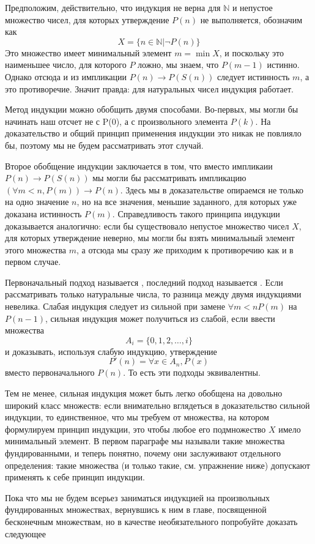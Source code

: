 Предположим, действительно, что индукция не верна для $\mathbb{N}$ и непустое множество чисел, для которых утверждение $P(n)$ не выполняется, обозначим как
$$X = \{n\in\mathbb{N}|\neg P(n)\}$$
Это множество имеет минимальный элемент $m=\min X$, и поскольку это наименьшее число, для которого $P$ ложно, мы знаем, что $P(m-1)$ истинно. Однако отсюда и из импликации $P(n)\to P(S(n))$ следует истинность $m$, а это противоречие. Значит правда: для натуральных чисел индукция работает.

Метод индукции можно обобщить двумя способами. Во-первых, мы могли бы начинать наш отсчет не с P(0), а с произвольного элемента $P(k)$. На доказательство и общий принцип применения индукции это никак не повлияло бы, поэтому мы не будем рассматривать этот случай.

Второе обобщение индукции заключается в том, что вместо импликаии $P(n)\to P(S(n))$ мы могли бы рассматривать импликацию $(\forall m<n, P(m))\to P(n)$. Здесь мы в доказательстве опираемся не только на одно значение $n$, но на все значения, меньшие заданного, для которых уже доказана истинность $P(m)$. Справедливость такого принципа индукции доказывается аналогично: если бы существовало непустое множество чисел $X$, для которых утверждение неверно, мы могли бы взять минимальный элемент этого множества $m$, а отсюда мы сразу же приходим к противоречию как и в первом случае.

Первоначальный подход называется , последний подход называется . Если рассматривать только натуральные числа, то разница между двумя индукциями невелика. Слабая индукция следует из сильной при замене $\forall m<n P(m)$ на $P(n-1)$, сильная индукция может получиться из слабой, если ввести множества
$$A_i = \{0, 1, 2, \ldots, i\}$$
и доказывать, используя слабую индукцию, утверждение
$$P'(n) = \forall x \in A_n, P(x)$$
вместо первоначального $P(n)$. То есть эти подходы эквивалентны.

Тем не менее, сильная индукция может быть легко обобщена на довольно широкий класс множеств: если внимательно вглядеться в доказательство сильной индукции, то единственное, что мы требуем от множества, на котором формулируем принцип индукции, это чтобы любое его подмножество $X$ имело минимальный элемент. В первом параграфе мы называли такие множества фундированными, и теперь понятно, почему они заслуживают отдельного определения: такие множества (и только такие, см. упражнение ниже) допускают применять к себе принцип индукции.

Пока что мы не будем всерьез заниматься индукцией на произвольных фундированных множествах, вернувшись к ним в главе, посвященной бесконечным множествам, но в качестве необязательного попробуйте доказать следующее

